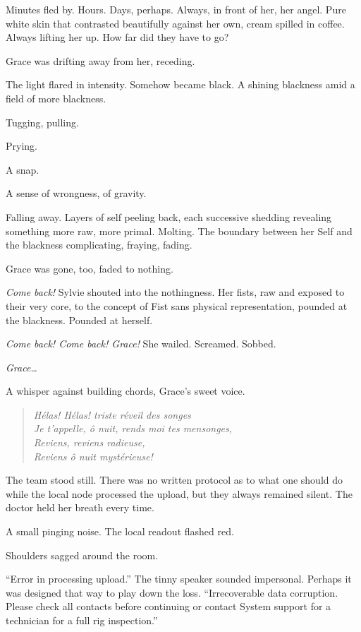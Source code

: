 Minutes fled by. Hours. Days, perhaps. Always, in front of her, her angel. Pure white skin that contrasted beautifully against her own, cream spilled in coffee. Always lifting her up. How far did they have to go?

Grace was drifting away from her, receding.

The light flared in intensity. Somehow became black. A shining blackness amid a field of more blackness.

Tugging, pulling.

Prying.

A snap.

A sense of wrongness, of gravity.

Falling away. Layers of self peeling back, each successive shedding revealing something more raw, more primal. Molting. The boundary between her Self and the blackness complicating, fraying, fading.

Grace was gone, too, faded to nothing.

\emph{Come back!} Sylvie shouted into the nothingness. Her fists, raw and exposed to their very core, to the concept of Fist sans physical representation, pounded at the blackness. Pounded at herself.

\emph{Come back! Come back! Grace!} She wailed. Screamed. Sobbed.

\emph{Grace\ldots{}}

A whisper against building chords, Grace's sweet voice.

\begin{quote}
\emph{Hélas! Hélas! triste réveil des songes\\
Je t'appelle, ô nuit, rends moi tes mensonges,\\
Reviens, reviens radieuse,\\
Reviens ô nuit mystérieuse!}
\end{quote}

The team stood still. There was no written protocol as to what one should do while the local node processed the upload, but they always remained silent. The doctor held her breath every time.

A small pinging noise. The local readout flashed red.

Shoulders sagged around the room.

``Error in processing upload.'' The tinny speaker sounded impersonal. Perhaps it was designed that way to play down the loss. ``Irrecoverable data corruption. Please check all contacts before continuing or contact System support for a technician for a full rig inspection.''

